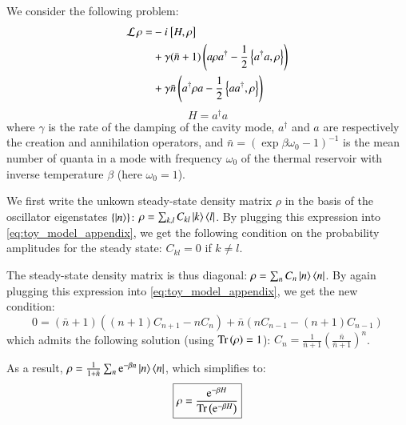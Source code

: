 We consider the following problem:
\begin{equation}
\label{eq:toy_model_appendix}
\begin{split}
    \mathcal{L} \,\rho = &- i\mkern1mu \left[ H, \rho \right] \\ &+ \gamma (\bar n + 1) \left( a \rho  a^\dag - \frac{1}{2} \left\{  a^\dag   a,  \rho \right\} \right)\\ &+ \gamma \bar n  \left( a^\dag  \rho  a - \frac{1}{2} \left\{ a   a^\dag,  \rho \right\} \right)
    \end{split}
\end{equation}
\begin{equation}
    H =  a^\dag a
\end{equation}
where $\gamma$ is the rate of the damping of the cavity mode, $a^\dag$ and $a$ are respectively the creation and annihilation operators, and $\bar n = \left( \exp{\beta \omega_0} - 1 \right)^{-1}$ is the mean number of quanta in a mode with frequency $\omega_0$ of the thermal reservoir with inverse temperature $\beta$ (here $\omega_0=1$).

We first write the unkown steady-state density matrix $\rho$ in the basis of the oscillator eigenstates $\{\ket{n}\}$:
$\rho = \sum_{k,l} C_{kl} \ket{k} \bra{l}$. By plugging this expression into \ref{eq:toy_model_appendix}, we get the following condition on the probability amplitudes for the steady state: $C_{kl} = 0$ if $k \ne l$.

The steady-state density matrix is thus diagonal:  $\rho = \sum_{n} C_{n} \ket{n} \bra{n}$. By again plugging this expression into \ref{eq:toy_model_appendix}, we get the new condition:
\begin{equation*}
    0 = (\bar n + 1) \left( (n+1)C_{n+1} - n C_n \right) + \bar n  \left( n C_{n-1} - (n+1) C_{n-1} \right)
\end{equation*}
which admits the following solution (using $\mathrm{Tr}\left( \rho \right)=1$): $C_n = \frac{1}{\bar n+1} \left( \frac{\bar n}{\bar n +1} \right)^n$.

As a result, $\rho = \frac{1}{1 + \bar n} \sum_n {\rm e}^{-\beta n} \ket{n} \bra{n}$, which simplifies to:
\begin{equation}
\boxed{
    \rho = \frac{{\rm e}^{- \beta H}}{\mathrm{Tr}\left( {\rm e}^{- \beta H} \right)}
    }
\end{equation}








